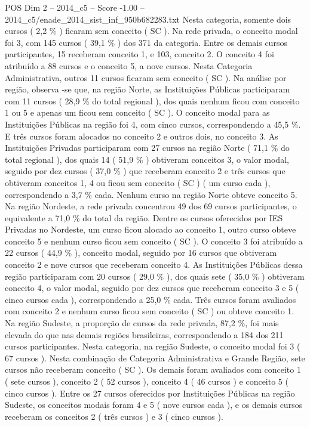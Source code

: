 \begin{textsample}{POS Dim 2 – 2014\_c5 – Score -1.00 – 2014\_c5/enade\_2014\_sist\_inf\_950b682283.txt}
Nesta categoria, somente dois cursos ( 2,2 \% ) ficaram sem conceito ( SC ).
Na rede privada, o conceito modal foi 3, com 145 cursos ( 39,1 \% ) dos 371 da categoria.
Entre os demais cursos participantes, 15 receberam conceito 1, e 103, conceito 2.
O conceito 4 foi atribuído a 88 cursos e o conceito 5, a nove cursos.
Nesta Categoria Administrativa, outros 11 cursos ficaram sem conceito ( SC ).
Na análise por região, observa -se que, na região Norte, as Instituições Públicas participaram com 11 cursos ( 28,9 \% do total regional ), dos quais nenhum ficou com conceito 1 ou 5 e apenas um ficou sem conceito ( SC ).
O conceito modal para as Instituições Públicas na região foi 4, com cinco cursos, correspondendo a 45,5 \%.
E três cursos foram alocados no conceito 2 e outros dois, no conceito 3.
As Instituições Privadas participaram com 27 cursos na região Norte ( 71,1 \% do total regional ), dos quais 14 ( 51,9 \% ) obtiveram conceitos 3, o valor modal, seguido por dez cursos ( 37,0 \% ) que receberam conceito 2 e três cursos que obtiveram conceitos 1, 4 ou ficou sem conceito ( SC ) ( um curso cada ), correspondendo a 3,7 \% cada.
Nenhum curso na região Norte obteve conceito 5.
Na região Nordeste, a rede privada concentrou 49 dos 69 cursos participantes, o equivalente a 71,0 \% do total da região.
Dentre os cursos oferecidos por IES Privadas no Nordeste, um curso ficou alocado ao conceito 1, outro curso obteve conceito 5 e nenhum curso ficou sem conceito ( SC ).
O conceito 3 foi atribuído a 22 cursos ( 44,9 \% ), conceito modal, seguido por 16 cursos que obtiveram conceito 2 e nove cursos que receberam conceito 4.
As Instituições Públicas dessa região participaram com 20 cursos ( 29,0 \% ), dos quais sete ( 35,0 \% ) obtiveram conceito 4, o valor modal, seguido por dez cursos que receberam conceito 3 e 5 ( cinco cursos cada ), correspondendo a 25,0 \% cada.
Três cursos foram avaliados com conceito 2 e nenhum curso ficou sem conceito ( SC ) ou obteve conceito 1.
Na região Sudeste, a proporção de cursos da rede privada, 87,2 \%, foi mais elevada do que nas demais regiões brasileiras, correspondendo a 184 dos 211 cursos participantes.
Nesta categoria, na região Sudeste, o conceito modal foi 3 ( 67 cursos ).
Nesta combinação de Categoria Administrativa e Grande Região, sete cursos não receberam conceito ( SC ).
Os demais foram avaliados com conceito 1 ( sete cursos ), conceito 2 ( 52 cursos ), conceito 4 ( 46 cursos ) e conceito 5 ( cinco cursos ).
Entre os 27 cursos oferecidos por Instituições Públicas na região Sudeste, os conceitos modais foram 4 e 5 ( nove cursos cada ), e os demais cursos receberam os conceitos 2 ( três cursos ) e 3 ( cinco cursos ).

\end{textsample}
